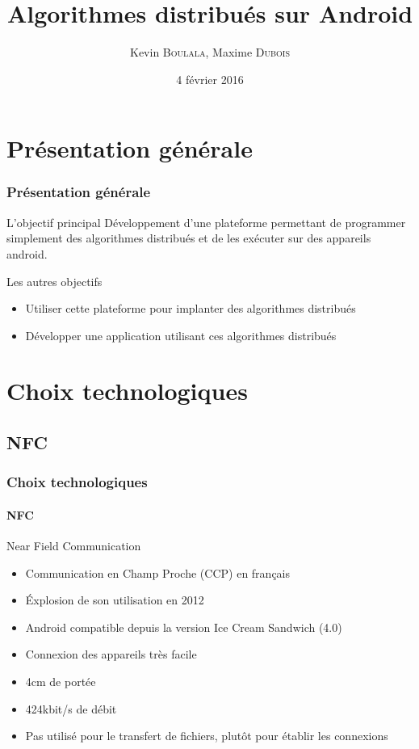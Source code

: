\documentclass{beamer}
\title{Algorithmes distribués sur Android}
\author{Kevin \textsc{Boulala}, Maxime \textsc{Dubois}}
\institute{Université de Franche Comté}
\date{4 février 2016}
\begin{document}
  \begin{frame}
    \titlepage
  \end{frame}

  \begin{frame}
    \setcounter{tocdepth}{1}
    \tableofcontents[]
  \end{frame}
  
  \section{Présentation générale}
  \begin{frame}
    \frametitle{Présentation générale}
    \begin{block}{L'objectif principal}
      Développement d'une plateforme permettant de programmer simplement des algorithmes distribués et de les exécuter sur des appareils android.
    \end{block}
    \begin{block}{Les autres objectifs}
      \begin{itemize}
        \item Utiliser cette plateforme pour implanter des algorithmes distribués
        \item Développer une application utilisant ces algorithmes distribués
      \end{itemize}
    \end{block}
  \end{frame}
  
  \section{Choix technologiques}
  \begin{frame}
    \setcounter{tocdepth}{2}
    \tableofcontents[currentsection]
  \end{frame}
    \subsection{NFC}
    \begin{frame}
      \frametitle{Choix technologiques}
      \framesubtitle{NFC}
      \begin{block}{Near Field Communication}
        \begin{itemize}
          \item Communication en Champ Proche (CCP) en français
          \item Éxplosion de son utilisation en 2012
          \item Android compatible depuis la version Ice Cream Sandwich (4.0)
          \item Connexion des appareils très facile
          \item 4cm de portée
          \item 424kbit/s de débit
          \item Pas utilisé pour le transfert de fichiers, plutôt pour établir les connexions
        \end{itemize}
      \end{block}
    \end{frame}
\end{document}
